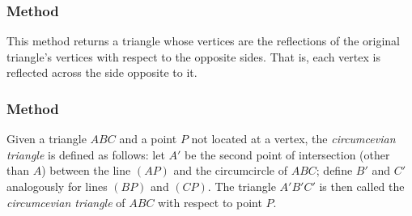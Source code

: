 \subsubsection{Method }
\label{ssub:method_triangle_reflection}

This method returns a triangle whose vertices are the reflections of the original triangle's vertices with respect to the opposite sides. That is, each vertex is reflected across the side opposite to it.

\begin{tkzexample}[latex=.5\textwidth]
\end{tkzexample}

\subsubsection{Method }
\label{ssub:method_triangle_circumcevian}

Given a triangle $ABC$ and a point $P$ not located at a vertex, the \emph{circumcevian triangle} is defined as follows: let $A'$ be the second point of intersection (other than $A$) between the line $(AP)$ and the circumcircle of $ABC$; define $B'$ and $C'$ analogously for lines $(BP)$ and $(CP)$. The triangle $A'B'C'$ is then called the \emph{circumcevian triangle} of $ABC$ with respect to point $P$.

\vspace{1em}

\begin{tkzexample}[latex=6cm]
\begin{center}
\end{center}

\end{tkzexample}

